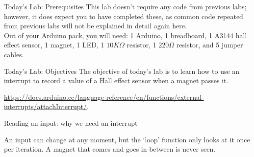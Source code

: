 \documentclass[aspectratio=169]{beamer}
\begin{document}
\begin{frame}{Today's Lab: Prerequisites}
    \Large
    This lab doesn't require any code from previous labs; however, it does expect you to have completed these, as common code repeated from previous labs will not be explained in detail again here.\\
    
    Out of your Arduino pack, you will need: 1 Arduino, 1 breadboard, 1 A3144 hall effect sensor, 1 magnet, 1 LED, 1 $10K\Omega$ resistor, 1 $220\Omega$ resistor, and 5 jumper cables.
\end{frame}

\begin{frame}{Today's Lab: Objectives}
    \Large
    The objective of today's lab is to learn how to use an interrupt to record a value of a Hall effect sensor when a magnet passes it.
    \vspace{.5em}
    
    \url{https://docs.arduino.cc/language-reference/en/functions/external-interrupts/attachInterrupt/}.
\end{frame}

\begin{frame}{Reading an input: why we need an interrupt}
    \begin{center}
    \end{center}

    \vspace{.5em}
    An input can change at any moment, but the `loop' function only looks at it once per iteration. A magnet that comes and goes in between is never seen.
\end{frame}
\end{document}
